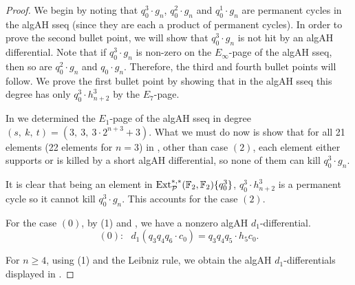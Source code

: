\begin{proof}
  We begin by noting that $q_0^3 \cdot g_n$, $q_0^2 \cdot g_n$ and $q_0^1 \cdot g_n$ are permanent cycles in the algAH sseq (since they are each a product of permanent cycles).
  In order to prove the second bullet point, we will show that $q_0^3 \cdot g_n$ is not hit by an algAH differential.
  Note that if $q_0^3 \cdot g_n$ is non-zero on the $E_\infty$-page of the algAH sseq, then so are
  $q_0^2 \cdot g_n$ and $q_0 \cdot g_n$. 
  Therefore, the third and fourth bullet points will follow.
  We prove the first bullet point by showing that in the algAH sseq this degree has only $q_0^3 \cdot h_{n+2}^3$ by the $E_7$-page.


  In  we determined the $E_1$-page of the algAH sseq in degree 
  $ (s, \ k, \ t)=(3, \ 3, \ 3\cdot 2^{n+3} + 3) $.
  What we must do now is show that 
  for all 21 elements (22 elements for $n=3$) in , other than case $(2)$, each element either supports or is killed by a short algAH differential, so none of them can kill $q_0^3 \cdot g_n$. %

It is clear that being an element in $\operatorname{\mathrm{Ext}}_{\mathcal{P}}^{*,*}(\operatorname{\mathbb{F}}_2, \operatorname{\mathbb{F}}_2)\{q_0^3\}$, $q_0^3 \cdot h_{n+2}^3$ is a permanent cycle so it cannot kill $q_0^3 \cdot g_n$. This accounts for the case $(2)$.

For the case $(0)$, by (1) and , we have a nonzero algAH $d_1$-differential.
$$(0): \ \ \ d_1(q_3q_4q_6\cdot c_0) = q_3q_4q_5 \cdot h_5c_0.$$

For $n \geq 4$, using (1) and the Leibniz rule, we obtain the algAH $d_1$-differentials displayed in .


\end{proof}
